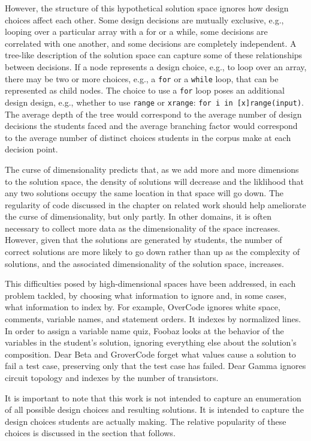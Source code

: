 However, the structure of this hypothetical solution space ignores how design choices affect each other. Some design decisions are mutually exclusive, e.g., looping over a particular array with a for or a while, some decisions are correlated with one another, and some decisions are completely independent. A tree-like description of the solution space can capture some of these relationships between decisions. If a node represents a design choice, e.g., to loop over an array, there may be two or more choices, e.g., a \texttt{for} or a \texttt{while} loop, that can be represented as child nodes. The choice to use a \texttt{for} loop poses an additional design design, e.g., whether to use \texttt{range} or \texttt{xrange}: \texttt{for i in [x]range(input)}. The average depth of the tree would correspond to the average number of design decisions the students faced and the average branching factor would correspond to the average number of distinct choices students in the corpus make at each decision point.

The curse of dimensionality predicts that, as we add more and more dimensions to the solution space, the density of solutions will decrease and the liklihood that any two solutions occupy the same location in that space will go down. The regularity of code discussed in the chapter on related work should help ameliorate the curse of dimensionality, but only partly. In other domains, it is often necessary to collect more data as the dimensionality of the space increases. However, given that the solutions are generated by students, the number of correct solutions are more likely to go down rather than up as the complexity of solutions, and the associated dimensionality of the solution space, increases.

This difficulties posed by high-dimensional spaces have been addressed, in each problem tackled, by choosing what information to ignore and, in some cases, what information to index by. For example, OverCode ignores white space, comments, variable names, and statement orders. It indexes by normalized lines. In order to assign a variable name quiz, Foobaz looks at the behavior of the variables in the student's solution, ignoring everything else about the solution's composition. Dear Beta and GroverCode forget what values cause a solution to fail a test case, preserving only that the test case has failed. Dear Gamma ignores circuit topology and indexes by the number of transistors.

It is important to note that this work is not intended to capture an enumeration of all possible design choices and resulting solutions. It is intended to capture the design choices students are actually making. The relative popularity of these choices is discussed in the section that follows.

